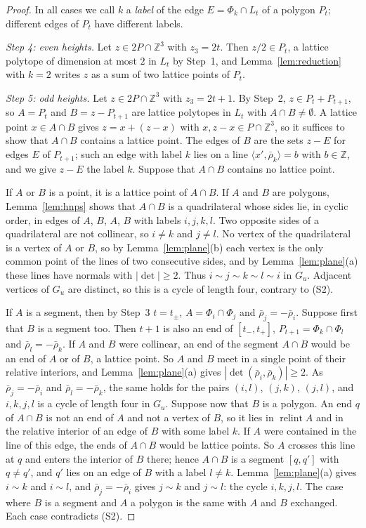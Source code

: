 \documentclass[12pt]{article}
\newcommand{\Z}{\mathbb{Z}}
\newcommand{\relint}{\operatorname{relint}}
\newcommand{\inn}[2]{\langle #1,#2\rangle}
\begin{document}
\begin{proof}
In all cases we call $k$ a \emph{label} of the edge $E=\Phi_k\cap L_t$ of a polygon $P_t$; different edges of $P_t$ have different labels.

\emph{Step 4: even heights.} Let $z\in2P\cap\Z^3$ with $z_3=2t$. Then $z/2\in P_t$, a lattice polytope of dimension at most $2$ in $L_t$ by Step~1, and Lemma~\ref{lem:reduction} with $k=2$ writes $z$ as a sum of two lattice points of $P_t$.

\emph{Step 5: odd heights.} Let $z\in2P\cap\Z^3$ with $z_3=2t+1$. By Step~2, $z\in P_t+P_{t+1}$, so $A=P_t$ and $B=z-P_{t+1}$ are lattice polytopes in $L_t$ with $A\cap B\ne\emptyset$. A lattice point $x\in A\cap B$ gives $z=x+(z-x)$ with $x,z-x\in P\cap\Z^3$, so it suffices to show that $A\cap B$ contains a lattice point. The edges of $B$ are the sets $z-E$ for edges $E$ of $P_{t+1}$; such an edge with label $k$ lies on a line $\inn{x'}{\bar\rho_k}=b$ with $b\in\Z$, and we give $z-E$ the label $k$. Suppose that $A\cap B$ contains no lattice point.

If $A$ or $B$ is a point, it is a lattice point of $A\cap B$. If $A$ and $B$ are polygons, Lemma~\ref{lem:hnps} shows that $A\cap B$ is a quadrilateral whose sides lie, in cyclic order, in edges of $A$, $B$, $A$, $B$ with labels $i,j,k,l$. Two opposite sides of a quadrilateral are not collinear, so $i\ne k$ and $j\ne l$. No vertex of the quadrilateral is a vertex of $A$ or $B$, so by Lemma~\ref{lem:plane}(b) each vertex is the only common point of the lines of two consecutive sides, and by Lemma~\ref{lem:plane}(a) these lines have normals with $|\det|\ge2$. Thus $i\sim j\sim k\sim l\sim i$ in $G_u$. Adjacent vertices of $G_u$ are distinct, so this is a cycle of length four, contrary to (S2).

If $A$ is a segment, then by Step~3 $t=t_\pm$, $A=\Phi_i\cap\Phi_j$ and $\bar\rho_j=-\bar\rho_i$. Suppose first that $B$ is a segment too. Then $t+1$ is also an end of $[t_-,t_+]$, $P_{t+1}=\Phi_k\cap\Phi_l$ and $\bar\rho_l=-\bar\rho_k$. If $A$ and $B$ were collinear, an end of the segment $A\cap B$ would be an end of $A$ or of $B$, a lattice point. So $A$ and $B$ meet in a single point of their relative interiors, and Lemma~\ref{lem:plane}(a) gives $|\det(\bar\rho_i,\bar\rho_k)|\ge2$. As $\bar\rho_j=-\bar\rho_i$ and $\bar\rho_l=-\bar\rho_k$, the same holds for the pairs $(i,l)$, $(j,k)$, $(j,l)$, and $i,k,j,l$ is a cycle of length four in $G_u$. Suppose now that $B$ is a polygon. An end $q$ of $A\cap B$ is not an end of $A$ and not a vertex of $B$, so it lies in $\relint A$ and in the relative interior of an edge of $B$ with some label $k$. If $A$ were contained in the line of this edge, the ends of $A\cap B$ would be lattice points. So $A$ crosses this line at $q$ and enters the interior of $B$ there; hence $A\cap B$ is a segment $[q,q']$ with $q\ne q'$, and $q'$ lies on an edge of $B$ with a label $l\ne k$. Lemma~\ref{lem:plane}(a) gives $i\sim k$ and $i\sim l$, and $\bar\rho_j=-\bar\rho_i$ gives $j\sim k$ and $j\sim l$: the cycle $i,k,j,l$. The case where $B$ is a segment and $A$ a polygon is the same with $A$ and $B$ exchanged. Each case contradicts (S2).
\end{proof}
\end{document}
